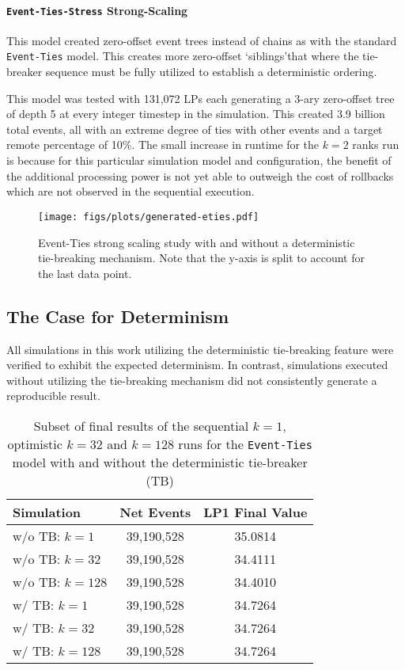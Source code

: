 \documentclass[nonacm,sigconf]{acmart}
\begin{document}
\paragraph{\texttt{Event-Ties-Stress} Strong-Scaling}\label{sec:stress-scaling}
This model created zero-offset event trees instead of chains as with the standard \texttt{Event-Ties} model. This creates more zero-offset \lq siblings\rq that where the tie-breaker sequence must be fully utilized to establish a deterministic ordering.

This model was tested with 131,072 LPs each generating a 3-ary zero-offset tree of depth 5 at every integer timestep in the simulation. This created 3.9 billion total events, all with an extreme degree of ties with other events and a target remote percentage of 10\%. The small increase in runtime for the $k=2$ ranks run is because for this particular simulation model and configuration, the benefit of the additional processing power is not yet able to outweigh the cost of rollbacks which are not observed in the sequential execution.

\begin{figure}
  \centering
  \texttt{[image: figs/plots/generated-eties.pdf]}
  \caption{Event-Ties strong scaling study with and without a deterministic tie-breaking mechanism. Note that the y-axis is split to account for the last data point.} \label{fig:eties}
\end{figure}

\subsection{The Case for Determinism}
All simulations in this work utilizing the deterministic tie-breaking feature were verified to exhibit the expected determinism. In contrast, simulations executed without utilizing the tie-breaking mechanism did not consistently generate a reproducible result.

\begin{table}[b]
  \caption{Subset of final results of the sequential $k=1$, optimistic $k=32$ and $k=128$ runs for the \texttt{Event-Ties} model with and without the deterministic tie-breaker (TB)}\label{tab:final-result}
\begin{tabular}{|l|c|c|}
\hline
Simulation & Net Events & LP1 Final Value\\\hline
w/o TB: $k=1$& 39,190,528 & 35.0814\\
w/o TB: $k=32$& 39,190,528 & 34.4111\\
w/o TB: $k=128$& 39,190,528 & 34.4010\\\hline
w/ TB: $k=1$& 39,190,528 & 34.7264 \\
w/ TB: $k=32$& 39,190,528 & 34.7264 \\
w/ TB: $k=128$& 39,190,528 & 34.7264 \\
\hline
\end{tabular}
\end{table}
\end{document}
